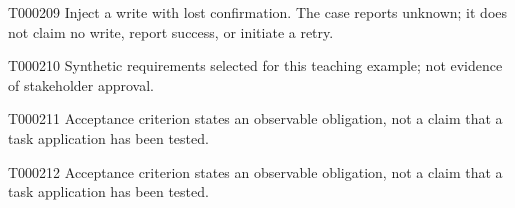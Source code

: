\documentclass[11pt,a4paper]{article}
\begin{document}
\begin{atlasparagraph}{T000209}
Inject a write with lost confirmation. The case reports unknown; it does not claim no write, report success, or initiate a retry.
\end{atlasparagraph}
\begin{atlasparagraph}{T000210}
Synthetic requirements selected for this teaching example; not evidence of stakeholder approval.
\end{atlasparagraph}
\begin{atlasparagraph}{T000211}
Acceptance criterion states an observable obligation, not a claim that a task application has been tested.
\end{atlasparagraph}
\begin{atlasparagraph}{T000212}
Acceptance criterion states an observable obligation, not a claim that a task application has been tested.
\end{atlasparagraph}
\end{document}

